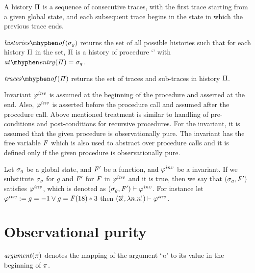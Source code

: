 \begin{definition}[history]
  A history $\Pi$ is a sequence of consecutive traces, with the
  first trace starting from a given global state, and each subsequent
  trace begins in the state in which the previous trace ends.
\end{definition}

\begin{definition} 
  $\historyOf{\gmap}$ returns the set of all possible histories such
  that for each history $\Pi$ in the set, $\Pi$ is a history
  of procedure `\foo' with $\atEntry{\history} = \gmap$.
\end{definition}

\begin{definition} $\tracesOf{\history}$ returns the set of traces and
  sub-traces in history $\Pi$.
\end{definition}

Invariant $\varphi^{inv}$ is assumed at the beginning of the procedure and
asserted at the end. Also, $\varphi^{inv}$ is asserted before the procedure
call and assumed after the procedure call. Above mentioned treatment
is similar to handling of pre-conditions and post-conditions for
recursive procedures. For the invariant, it is assumed that the given
procedure is observationally pure. The invariant has the free variable
$\mathit{F}$ which is also used to abstract over procedure calls and it is
defined only if the given procedure is observationally pure.

Let $\sigma_g$ be a global state, and $\mathit{F}'$ be a function, and $\varphi^{inv}$
be a invariant. If we substitute $\sigma_g$ for $g$ and $\mathit{F}'$ for $\mathit{F}$
in $\varphi^{inv}$ and it is true, then we say that $(\sigma_g, \mathit{F}')$ satisfies
$\varphi^{inv}$, which is denoted as $(\sigma_g, \mathit{F}') \vdash \varphi^{inv}$. For
instance let $\varphi^{inv} := g = -1 \vee g = \mathit{F}(18) * 3$ then $(3!, \lambda
n. n!) \vdash \varphi^{inv}$.

\section{Observational purity}\label{sec:op}

\begin{definition}
  $\mathit{argument(\pi)}$ denotes the mapping of the argument `$\textit{n}$' to its
  value in the beginning of $\pi$.
\end{definition}


